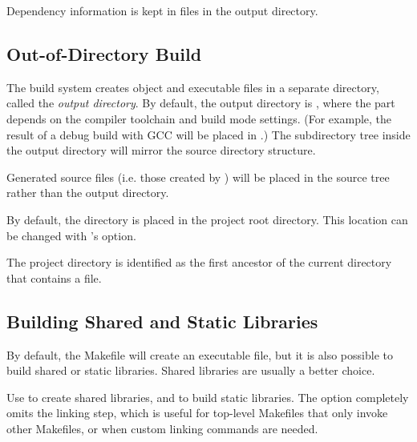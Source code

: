 Dependency information is kept in  files in the output directory.


\subsection{Out-of-Directory Build}
\label{sec:build-sim-progs:out-of-directory-build}

The build system creates object and executable files in a separate directory, called the
\textit{output directory}. By default, the output directory is ,
where the  part depends on the compiler toolchain and build mode settings.
(For example, the result of a debug build with GCC will be placed in .)
The subdirectory tree inside the output directory will mirror the source directory
structure.

\begin{note}
Generated source files (i.e. those created by ) will be placed in the
source tree rather than the output directory.
\end{note}

By default, the  directory is placed in the project root directory. This location
can be changed with 's  option.


\begin{note}
The project directory is identified as the first ancestor of the current directory
that contains a  file.
\end{note}


\subsection{Building Shared and Static Libraries}
\label{sec:build-sim-progs:building-shared-and-static-libraries}

By default, the Makefile will create an executable file, but it is also
possible to build shared or static libraries. Shared libraries
are usually a better choice.

Use  to create shared libraries, and 
to build static libraries. The  option completely omits
the linking step, which is useful for top-level Makefiles that only invoke
other Makefiles, or when custom linking commands are needed.


